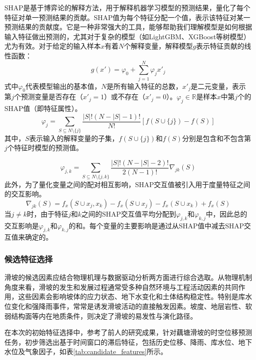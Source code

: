 \documentclass[12pt,a4paper]{article}
\begin{document}
SHAP是基于博弈论的解释方法，用于解释机器学习模型的预测结果，量化了每个特征对单一预测结果的贡献。SHAP值为每个特征分配一个值，表示该特征对某一预测结果的贡献度。它是一种非常强大的工具，能够帮助我们理解模型是如何根据输入特征做出预测的，尤其对于复杂的模型（如LightGBM、XGBoost等树模型）尤为有效。对于给定的输入样本$x$有着$N$个解释变量，解释模型$g$表示特征贡献的线性函数：
\begin{equation}
g(x') = \varphi_0 + \sum_{j=1}^{N} \varphi_j x'_j
\end{equation}
式中$\varphi_0$代表模型输出的基本值，$N$是所有输入特征的总数，$x'_j$是二元变量，表示第$j$个预测变量是否存在（$x'_j=1$）或不存在（$x'_j=0$）。$\varphi_j \in \mathbb{R}$是样本$x$中第$j$个的SHAP值（即特征属性）。
\begin{equation}
\varphi_j = \sum_{S \subseteq N \setminus \{j\}} \frac{|S|!(N-|S|-1)!}{N!}[f(S\cup\{j\})-f(S)]
\end{equation}
其中，$S$表示输入的解释变量的子集，$f(S\cup\{j\})$和$f(S)$分别是包含和不包含第$j$个特征时模型的预测值。

\begin{equation}
\varphi_{j,k} = \sum_{S \subseteq N \setminus \{j,k\}} \frac{|S|!(N-|S|-2)!}{2(N-1)!} \nabla_{jk}(S)
\end{equation}
此外，为了量化变量之间的配对相互影响，SHAP交互值被引入用于度量特征之间的交互影响。
\begin{equation}
\nabla_{jk}(S) = f_x(S\cup x_j, x_k) - f_x(S\cup x_j) - f_x(S\cup x_k) + f_x(S)
\end{equation}
当$j \neq k$时，由于特征$j$和$k$之间的SHAP交互值平均分配到$\varphi_{j,k}$和$\varphi_{k,j}$中，因此总的交互影响是$\varphi_{j,k}$和$\varphi_{k,j}$的和。每个变量的主要影响是通过从SHAP值中减去SHAP交互值来确定的。

\subsubsection{候选特征选择}

滑坡的候选因素应结合物理机理与数据驱动分析两方面进行综合选取。从物理机制角度来看，滑坡的发生和发展过程通常受多种自然环境与工程活动因素的共同作用，这些因素会影响坡体的应力状态、地下水变化和土体结构稳定性。特别是库水位变化和强降雨事件，常常是诱发滑坡活动的直接触发因素。坡度、地层岩性、软弱结构面等内在地质条件，则决定了滑坡的易发性与演化路径。

在本次的初始特征选择中，参考了前人的研究成果，针对藕塘滑坡的时空位移预测任务，初步筛选出基于时间窗口的滞后特征，包括历史位移、降雨、库水位、地下水位及气象因子，如表\ref{tab:candidate_features}所示。
\end{document}
